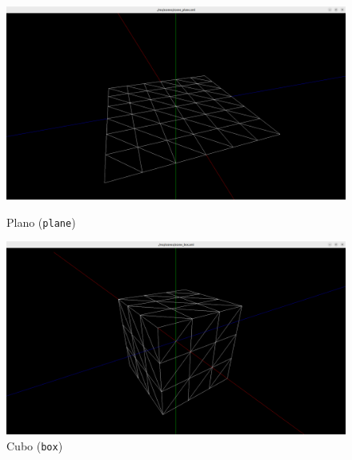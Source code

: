 \documentclass[12pt, a4paper]{article}
\begin{document}
\begin{figure}[H]
    \centering
    \begin{minipage}{0.48\textwidth}
        \centering
        \includegraphics[width=\textwidth]{res/results/Plane.png}
        \caption{Plano (\texttt{plane})}
    \end{minipage}\hfill
    \begin{minipage}{0.48\textwidth}
        \centering
        \includegraphics[width=\textwidth]{res/results/Box.png}
        \caption{Cubo (\texttt{box})}
    \end{minipage}
\end{figure}
\end{document}
